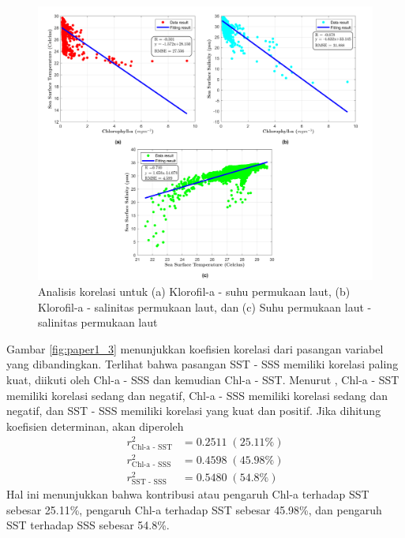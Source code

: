 \begin{spacing}{1.5}
	\begin{figure}[H]
		\centering
		\includegraphics[width=15cm]{contents/final_figure_paper1/gambar_2}
		\caption{Analisis korelasi untuk (a) Klorofil-a - suhu permukaan laut, (b) Klorofil-a - salinitas permukaan laut, dan (c) Suhu permukaan laut - salinitas permukaan laut}
		\label{fig:paper1_2}
	\end{figure}
	
	Gambar \ref{fig:paper1_3} menunjukkan koefisien korelasi dari pasangan variabel yang dibandingkan. Terlihat bahwa pasangan SST - SSS memiliki korelasi paling kuat, diikuti oleh Chl-a - SSS dan kemudian Chl-a - SST. Menurut , Chl-a - SST memiliki korelasi sedang dan negatif, Chl-a - SSS memiliki korelasi sedang dan negatif, dan SST - SSS memiliki korelasi yang kuat dan positif. Jika dihitung koefisien determinan, akan diperoleh
	\begin{equation*}
		\begin{aligned}
			r^2_\text{Chl-a - SST}&=0.2511 \;(25.11\%) \\
			r^2_\text{Chl-a - SSS}&=0.4598 \;(45.98\%) \\
			r^2_\text{SST - SSS}&=0.5480 \;(54.8\%) 
		\end{aligned}	
	\end{equation*} 
	Hal ini menunjukkan bahwa kontribusi atau pengaruh Chl-a terhadap SST sebesar 25.11\%, pengaruh Chl-a terhadap SST sebesar 45.98\%, dan pengaruh SST terhadap SSS sebesar 54.8\%. 
	

\end{spacing}
